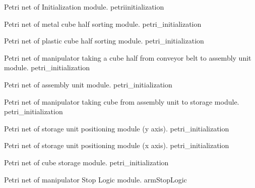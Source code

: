 {Petri net of Initialization module.}
{petriinitialization}
\newpage


\newpage
{}
{Petri net of metal cube half sorting module.}
{petri_initialization}
\newpage


\newpage
{}
{Petri net of plastic cube half sorting module.}
{petri_initialization}
\newpage


\newpage
{}
{Petri net of manipulator taking a cube half from conveyor belt to assembly unit
  module.}
{petri_initialization}
\newpage


\clearpage
\pagebreak
{}
{Petri net of assembly unit module.}
{petri_initialization}
\newpage


\newpage
{}
{Petri net of manipulator taking cube from assembly unit to storage module.}
{petri_initialization}
\newpage


\newpage
{}
{Petri net of storage unit positioning module (y axis).}
{petri_initialization}
\newpage


\newpage
{}
{Petri net of storage unit positioning module (x axis).}
{petri_initialization}
\newpage


\newpage
{}
{Petri net of cube storage module.}
{petri_initialization}
\newpage




\newpage

{Petri net of manipulator Stop Logic module.}
{armStopLogic}

\newpage






